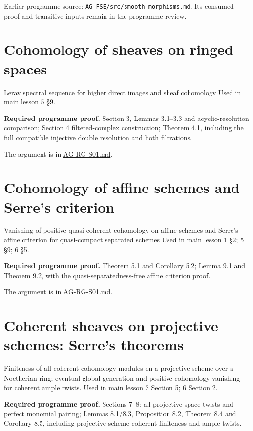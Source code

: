 \documentclass[11pt,a4paper,openany]{report}
\begin{document}
Earlier programme source: \texttt{AG-FSE/src/smooth-morphisms.md}. Its consumed proof and transitive inputs remain in the programme review.

\section{Cohomology of sheaves on ringed spaces}\label{cohomology-of-sheaves-on-ringed-spaces}

Leray spectral sequence for higher direct images and sheaf cohomology Used in main lesson 5 §9.

\textbf{Required programme proof.} Section 3, Lemmas 3.1--3.3 and acyclic-resolution comparison; Section 4 filtered-complex construction; Theorem 4.1, including the full compatible injective double resolution and both filtrations.

The argument is in \href{https://github.com/KokunoYumeto/open-math-courses/blob/main/docs/courses/AG-RG/AG-RG-S01.md}{AG-RG-S01.md}.

\section{Cohomology of affine schemes and Serre's criterion}\label{cohomology-of-affine-schemes-and-serres-criterion}

Vanishing of positive quasi-coherent cohomology on affine schemes and Serre's affine criterion for quasi-compact separated schemes Used in main lesson 1 §2; 5 §9; 6 §5.

\textbf{Required programme proof.} Theorem 5.1 and Corollary 5.2; Lemma 9.1 and Theorem 9.2, with the quasi-separatedness-free affine criterion proof.

The argument is in \href{https://github.com/KokunoYumeto/open-math-courses/blob/main/docs/courses/AG-RG/AG-RG-S01.md}{AG-RG-S01.md}.

\section{Coherent sheaves on projective schemes: Serre's theorems}\label{coherent-sheaves-on-projective-schemes-serres-theorems}

Finiteness of all coherent cohomology modules on a projective scheme over a Noetherian ring; eventual global generation and positive-cohomology vanishing for coherent ample twists. Used in main lesson 3 Section 5; 6 Section 2.

\textbf{Required programme proof.} Sections 7--8: all projective-space twists and perfect monomial pairing; Lemmas 8.1/8.3, Proposition 8.2, Theorem 8.4 and Corollary 8.5, including projective-scheme coherent finiteness and ample twists.
\end{document}
